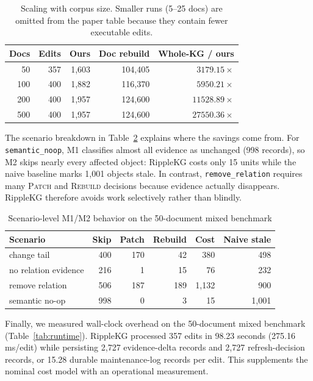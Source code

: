\documentclass[conference]{IEEEtran}
\begin{document}
\begin{table}[t]
\caption{Scaling with corpus size. Smaller runs (5--25 docs) are omitted from the paper table because they contain fewer executable edits.}
\label{tab:scale}
\centering
\footnotesize
\setlength{\tabcolsep}{3pt}
\begin{tabular}{rrrrr}
\toprule
\textbf{Docs} & \textbf{Edits} & \textbf{Ours} & \textbf{Doc rebuild} & \textbf{Whole-KG / ours}\\
\midrule
50  & 357 & 1{,}603 & 104{,}405 & $3179.15\times$\\
100 & 400 & 1{,}882 & 116{,}370 & $5950.21\times$\\
200 & 400 & 1{,}957 & 124{,}600 & $11528.89\times$\\
500 & 400 & 1{,}957 & 124{,}600 & $27550.36\times$\\
\bottomrule
\end{tabular}
\end{table}

The scenario breakdown in Table~\ref{tab:scenario} explains where the savings
come from. For \texttt{semantic\_noop}, M1 classifies almost all evidence as
unchanged (998 records), so M2 skips nearly every affected object: RippleKG costs
only 15 units while the naive baseline marks 1{,}001 objects stale. In contrast,
\texttt{remove\_relation} requires many \textsc{Patch} and \textsc{Rebuild}
decisions because evidence actually disappears. RippleKG therefore avoids work
selectively rather than blindly.

\begin{table}[t]
\caption{Scenario-level M1/M2 behavior on the 50-document mixed benchmark}
\label{tab:scenario}
\centering
\footnotesize
\setlength{\tabcolsep}{2.5pt}
\begin{tabular}{lrrrrr}
\toprule
\textbf{Scenario} & \textbf{Skip} & \textbf{Patch} & \textbf{Rebuild} & \textbf{Cost} & \textbf{Naive stale}\\
\midrule
change tail & 400 & 170 & 42  & 380  & 498\\
no relation evidence & 216 & 1   & 15  & 76   & 232\\
remove relation & 506 & 187 & 189 & 1{,}132 & 900\\
semantic no-op & 998 & 0   & 3   & 15   & 1{,}001\\
\bottomrule
\end{tabular}
\end{table}

Finally, we measured wall-clock overhead on the 50-document mixed benchmark
(Table~\ref{tab:runtime}). RippleKG processed 357 edits in 98.23 seconds
(275.16 ms/edit) while persisting 2{,}727 evidence-delta records and 2{,}727
refresh-decision records, or 15.28 durable maintenance-log records per edit.
This supplements the nominal cost model with an operational measurement.
\end{document}
